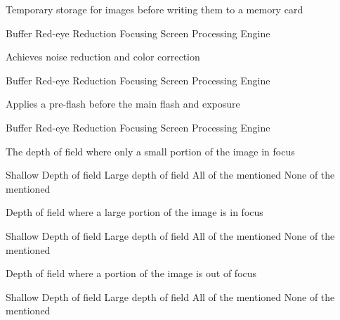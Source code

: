 \documentclass[theme=sleek, randomorder, hidesidemenu]{webquiz}
\begin{document}
\begin{question}
  Temporary storage for images before writing them to a memory card
  \begin{choice}[columns=2]
    \correct Buffer
    \incorrect Red-eye Reduction
    \incorrect Focusing Screen
    \incorrect Processing Engine
  \end{choice}
\end{question}

\begin{question}
  Achieves noise reduction and color correction
  \begin{choice}[columns=2]
    \incorrect Buffer
    \incorrect Red-eye Reduction
    \incorrect Focusing Screen
    \correct Processing Engine
  \end{choice}
\end{question}

\begin{question}
  Applies a pre-flash before the main flash and exposure
  \begin{choice}[columns=2]
    \incorrect Buffer
    \correct Red-eye Reduction
    \incorrect Focusing Screen
    \incorrect Processing Engine
  \end{choice}
\end{question}

\begin{question}
  The depth of field where only a small portion of the image in focus
  \begin{choice}[columns=2]
    \correct Shallow Depth of field
    \incorrect Large depth of field
    \incorrect All of the mentioned
    \incorrect None of the mentioned
  \end{choice}
\end{question}

\begin{question}
  Depth of field where a large portion of the image is in focus
  \begin{choice}[columns=2]
    \incorrect Shallow Depth of field
    \correct Large depth of field
    \incorrect All of the mentioned
    \incorrect None of the mentioned
  \end{choice}
\end{question}

\begin{question}
  Depth of field where a portion of the image is out of focus
  \begin{choice}[columns=2]
    \incorrect Shallow Depth of field
    \incorrect Large depth of field
    \correct All of the mentioned
    \incorrect None of the mentioned
  \end{choice}
\end{question}
\end{document}

